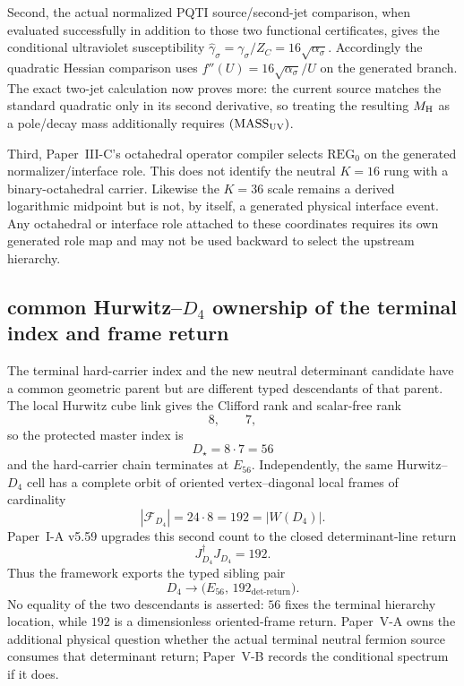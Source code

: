 \documentclass[12pt,a4paper]{article}
\begin{document}
Second, the actual normalized PQTI source/second-jet comparison, when
evaluated successfully in addition to those two functional certificates, gives the conditional
ultraviolet susceptibility
\(\widehat\gamma_\sigma=\gamma_\sigma/Z_C
=16\sqrt{\alpha_\sigma}\).  Accordingly the quadratic Hessian comparison
uses \(f''(U)=16\sqrt{\alpha_\sigma}/U\) on the generated branch.
The exact two-jet calculation now proves more: the current source matches the
standard quadratic only in its second derivative, so treating the resulting
\(M_{\rm H}\) as a pole/decay mass additionally requires
\((\mathrm{MASS}_{\rm UV})\).

Third, Paper~III-C's octahedral operator compiler selects
\(\mathrm{REG}_0\) on the generated normalizer/interface role.  This does
not identify the neutral $K=16$ rung with a binary-octahedral carrier.  Likewise the
$K=36$ scale remains a derived logarithmic midpoint but is not, by itself, a
generated physical interface event.  Any octahedral or interface role attached
to these coordinates requires its own generated role map and may not be used
backward to select the upstream hierarchy.



\subsection{common Hurwitz--\texorpdfstring{\(D_4\)}{D4} ownership of the terminal index and frame return}
\label{p8:sec:v297-d4-k56-terminal-pair}

The terminal hard-carrier index and the new neutral determinant candidate have
a common geometric parent but are different typed descendants of that parent.
The local Hurwitz cube link gives the Clifford rank and scalar-free rank
\[
 8,\qquad7,
\]
so the protected master index is
\[
 \boxed{D_\star=8\cdot7=56}
\]
and the hard-carrier chain terminates at \(E_{56}\).  Independently, the same
Hurwitz--\(D_4\) cell has a complete orbit of oriented vertex--diagonal local
frames of cardinality
\[
 \boxed{|\mathcal F_{D_4}|=24\cdot8=192=|W(D_4)|.}
\]
Paper~I-A v5.59 upgrades this second count to the closed determinant-line
return
\[
 \boxed{J_{D_4}^{\dagger}J_{D_4}=192.}
\]
Thus the framework exports the typed sibling pair
\[
 \boxed{D_4\longrightarrow\bigl(E_{56},\,192_{\det\text{-return}}\bigr).}
\]
No equality of the two descendants is asserted: \(56\) fixes the terminal
hierarchy location, while \(192\) is a dimensionless oriented-frame return.
Paper~V-A owns the additional physical question whether the actual terminal
neutral fermion source consumes that determinant return; Paper~V-B records the
conditional spectrum if it does.
\end{document}
